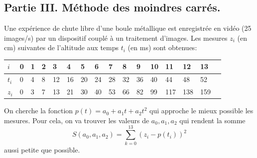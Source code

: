 \subsection*{Partie III. Méthode des moindres carrés.}
Une expérience de chute libre d'une boule métallique est enregistrée en vidéo (25 images/s) par un dispositif couplé à un traitement d'images. Les mesures $z_i$ (en cm) suivantes de l'altitude aux temps $t_i$ (en ms) sont obtenues:
\begin{center}\renewcommand{\arraystretch}{1.1}
\begin{tabular}{|l|l|l|l|l|l|l|l|l|l|l|l|l|l|l|l|}
\hline
$i$ &0 &1 & 2 & 3 & 4 & 5 & 6 & 7 & 8 & 9 & 10 & 11 & 12 & 13 \\ \hline
$t_i$ & 0 & 4 & 8 & 12 & 16 & 20 & 24 & 28 & 32 & 36 & 40 & 44 & 48 & 52\\ \hline
$z_i$ & 0 & 3 & 7 & 13 & 21 & 30 & 40 & 53 & 66 & 82 & 99 & 117 & 138 & 159 \\ \hline
\end{tabular}
\end{center}
On cherche la fonction $p(t) = a_0 + a_1t + a_2 t^2$ qui approche le mieux possible les mesures. Pour cela, on va trouver les valeurs de $a_0, a_1, a_2$ qui rendent la somme
\begin{displaymath}
 S(a_0,a_1,a_2) = \sum_{k=0}^{13}\left( z_i - p(t_i)\right)^2
\end{displaymath}
aussi petite que possible.
